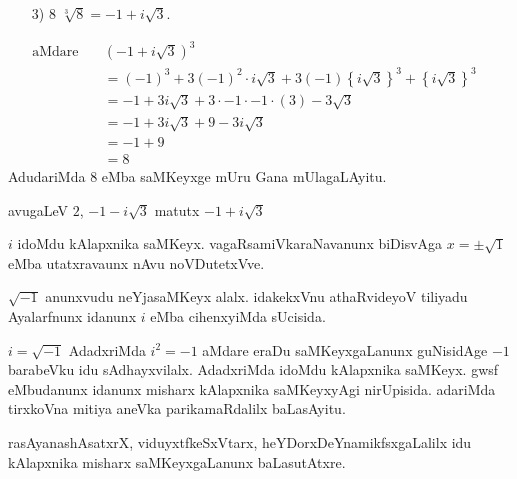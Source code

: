 \begin{itemize}
\item[{\rm 3)}] 8  $\sqrt[3]{8} = -1 +i\sqrt{3}$.
\end{itemize}
\begin{align*}
\text{aMdare}\quad &(-1+i\sqrt{3})^3&\\
&= (-1)^3 + 3(-1)^2\cdot i\sqrt{3}+3(-1)\left\{i\sqrt{3}\right\}^3 + \left\{i\sqrt{3}\right\}^3\\
&= -1 + 3i\sqrt{3} +3\cdot -1\cdot -1 \cdot (3) - 3\sqrt{3}\\
&= -1+3i\sqrt{3}+9 -3i\sqrt{3}\\
&= -1+9\\
&= 8
\end{align*}
AdudariMda $8$ eMba saMKeyxge mUru Gana mUlagaLAyitu.

avugaLeV $2$, $-1-i\sqrt{3}$ \;matutx\; $-1+i\sqrt{3}$ 

$i$ idoMdu kAlapxnika saMKeyx. vagaRsamiVkaraNavanunx biDisvAga $x =\pm \sqrt{1}$ eMba utatxravaunx nAvu noVDutetxVve.

$\sqrt{-1}$ anunxvudu neYjasaMKeyx alalx. idakekxVnu athaRvideyoV tiliyadu Ayalarfnunx idanunx $i$ eMba cihenxyiMda sUcisida.

$i=\sqrt{-1}$ AdadxriMda $i^2=-1$ aMdare eraDu saMKeyxgaLanunx guNisidAge $-1$ barabeVku idu sAdhayxvilalx. AdadxriMda idoMdu kAlapxnika saMKeyx. gwsf eMbudanunx idanunx misharx kAlapxnika saMKeyxyAgi nirUpisida. adariMda tirxkoVna mitiya aneVka parikamaRdalilx baLasAyitu.

rasAyanashAsatxrX, viduyxtfkeSxVtarx, heYDorxDeYnamikfsxgaLalilx idu kAlapxnika misharx saMKeyxgaLanunx baLasutAtxre.
